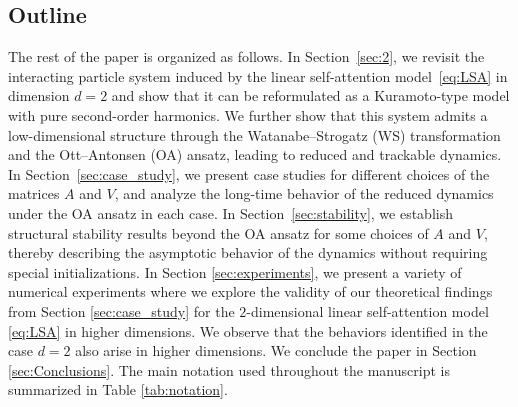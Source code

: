 \documentclass[10pt]{article}
\theoremstyle{definition}
\theoremstyle{definition}
\numberwithin{equation}{section}
\begin{document}





\subsection{Outline} The rest of the paper is organized as follows. 
In Section~\ref{sec:2}, we revisit the interacting particle system induced by the linear self-attention model~\eqref{eq:LSA} in dimension $d=2$ and show that it can be reformulated as a Kuramoto-type model with pure second-order harmonics.
We further show that this system admits a low-dimensional structure through the Watanabe--Strogatz (WS) transformation and the Ott--Antonsen (OA) ansatz, leading to reduced and trackable dynamics.
In Section~\ref{sec:case_study}, we present case studies for different choices of the matrices $A$ and $V$, and analyze the long-time behavior of the reduced dynamics under the OA ansatz in each case.
In Section~\ref{sec:stability}, we establish structural stability results beyond the OA ansatz for some choices of $A$ and $V$, thereby describing the asymptotic behavior of the dynamics without requiring special initializations. 
In Section \ref{sec:experiments}, we present a variety of numerical experiments where we explore the validity of our theoretical findings from Section \ref{sec:case_study} for the $2$-dimensional linear self-attention model \eqref{eq:LSA} in higher dimensions. 
We observe that the behaviors identified in the case $d = 2$ also arise in higher dimensions. 
We conclude the paper in Section \ref{sec:Conclusions}.
The main notation used throughout the manuscript is summarized in Table \ref{tab:notation}.
\end{document}

